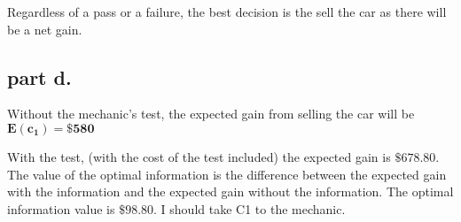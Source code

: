 Regardless of a pass or a failure, the best decision is the sell the car as there will be a net gain.

\subsection{part d.}
Without the mechanic's test, the expected gain from selling the car will be 
$\mathbf{E(c_1) = \$580} $

With the test, (with the cost of the test included) the expected gain is $\mathbf{ \$678.80}$. The value of the optimal information is the difference between the expected gain with the information and the expected gain without the information. The optimal information value is $\mathbf{\$98.80}$.
I should take C1 to the mechanic.

